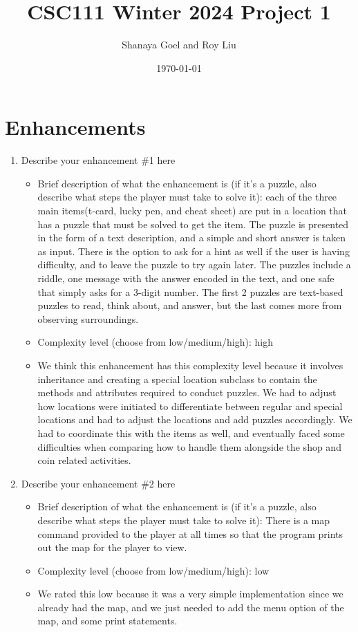 \documentclass[11pt]{article}
\title{CSC111 Winter 2024 Project 1}
\author{Shanaya Goel and Roy Liu}
\date{\today}
\begin{document}
\maketitle

\section*{Enhancements}


\begin{enumerate}

\item Describe your enhancement \#1 here
	\begin{itemize}
	\item Brief description of what the enhancement is (if it's a puzzle, also describe what steps the player must take to solve it): each of the three main items(t-card, lucky pen, and cheat sheet) are put in a location that has a puzzle that must be solved to get the item. The puzzle is presented in the form of a text description, and a simple and short answer is taken as input. There is the option to ask for a hint as well if the user is having difficulty, and to leave the puzzle to try again later. The puzzles include a riddle, one message with the answer encoded in the text, and one safe that simply asks for a 3-digit number. The first 2 puzzles are text-based puzzles to read, think about, and answer, but the last comes more from observing surroundings.
	\item Complexity level (choose from low/medium/high): high
	\item We think this enhancement has this complexity level because it involves inheritance and creating a special location subclass to contain the methods and attributes required to conduct puzzles. We had to adjust how locations were initiated to differentiate between regular and special locations and had to adjust the locations and add puzzles accordingly. We had to coordinate this with the items as well, and eventually faced some difficulties when comparing how to handle them alongside the shop and coin related activities. 
	\end{itemize}
 
\item Describe your enhancement \#2 here
	\begin{itemize}
	\item Brief description of what the enhancement is (if it's a puzzle, also describe what steps the player must take to solve it): There is a map command provided to the player at all times so that the program prints out the map for the player to view.
	\item Complexity level (choose from low/medium/high): low
	\item  We rated this low because it was a very simple implementation since we already had the map, and we just needed to add the menu option of the map, and some print statements.
	\end{itemize}
 

\end{enumerate}
\end{document}

